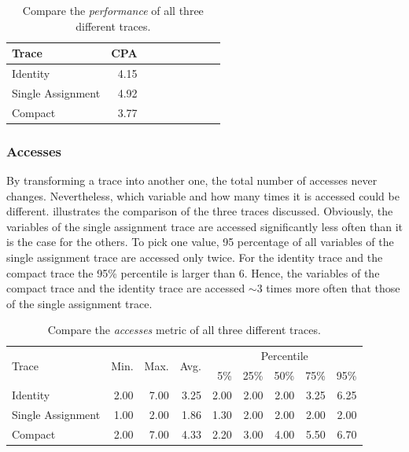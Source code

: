 \documentclass[onecolumn, openright, master, english, signatures]{dbrgrptt}
\begin{document}
\begin{table}[!ht]
  \centering
  \begin{tabular}{lrrrrrrrr}
    \hline
    Trace & \ac{CPA} \tabularnewline
    \hline
    Identity          & 4.15 \\
    Single Assignment & 4.92 \\
    Compact           & 3.77 \\
    \hline
  \end{tabular}
  \caption{Compare the \emph{performance} of all three different \ac{trace}s.}
  \label{tab:summarizing-example-performance}
\end{table}

\subsubsection{Accesses}

By transforming a \ac{trace} into another one, the total number of accesses never changes.
Nevertheless, which variable and how many times it is accessed could be different.
 illustrates the comparison of the three \ac{trace}s discussed.
Obviously, the variables of the single assignment \ac{trace} are accessed significantly less often than it is the case for the others.
To pick one value, 95 percentage of all variables of the single assignment \ac{trace} are accessed only twice.
For the identity \ac{trace} and the compact \ac{trace} the 95\% percentile is larger than 6.
Hence, the variables of the compact \ac{trace} and the identity \ac{trace} are accessed $\sim3$ times more often that those of the single assignment \ac{trace}.

\begin{table}[!ht]
  \centering
  \begin{tabular}{lrrrrrrrr}
    \hline
    \multirow{2}{*}{Trace} & \multirow{2}{*}{Min.} & \multirow{2}{*}{Max.} & \multirow{2}{*}{Avg.} & \multicolumn{5}{c}{Percentile} \tabularnewline
    & & & & 5\% & 25\% & 50\% & 75\% & 95\% \tabularnewline
    \hline
    Identity          & 2.00 & 7.00 & 3.25 & 2.00 & 2.00 & 2.00 & 3.25 & 6.25 \\
    Single Assignment & 1.00 & 2.00 & 1.86 & 1.30 & 2.00 & 2.00 & 2.00 & 2.00 \\
    Compact           & 2.00 & 7.00 & 4.33 & 2.20 & 3.00 & 4.00 & 5.50 & 6.70 \\
    \hline
  \end{tabular}
  \caption{Compare the \emph{accesses} metric of all three different \ac{trace}s.}
  \label{tab:summarizing-example-metrics-overview-accesses}
\end{table}
\end{document}
